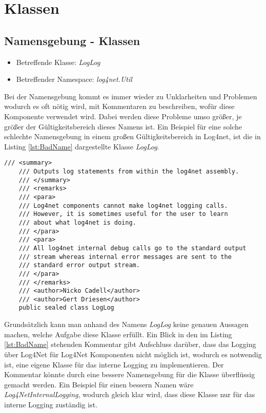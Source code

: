 \section{Klassen}


\subsection{Namensgebung - Klassen}
\begin{itemize}
	\item Betreffende Klasse: \textit{LogLog}
	\item Betreffender Namespace: \textit{log4net.Util}
\end{itemize}

Bei der Namensgebung kommt es immer wieder zu Unklarheiten und Problemen wodurch es oft nötig wird, mit Kommentaren zu beschreiben, wofür diese Komponente verwendet wird. Dabei werden diese Probleme umso größer, je größer der Gültigkeitsbereich dieses Namens ist. Ein Beispiel für eine solche schlechte Namensgebung in einem großen Gültigkeitsbereich in Log4net, ist die in Listing \ref{lst:BadName} dargestellte Klasse \textit{LogLog}. 

\begin{lstlisting}[language={[Sharp]C}, caption=Beispiele für schlechte Namensgebung, label=lst:BadName]
/// <summary>
	/// Outputs log statements from within the log4net assembly.
	/// </summary>
	/// <remarks>
	/// <para>
	/// Log4net components cannot make log4net logging calls.
	/// However, it is sometimes useful for the user to learn 
	/// about what log4net is doing.
	/// </para>
	/// <para>
	/// All log4net internal debug calls go to the standard output 
	/// stream whereas internal error messages are sent to the 
	/// standard error output stream.
	/// </para>
	/// </remarks>
	/// <author>Nicko Cadell</author>
	/// <author>Gert Driesen</author>
	public sealed class LogLog
\end{lstlisting}

Grundsätzlich kann man anhand des Namens \textit{LogLog} keine genauen Aussagen machen, welche Aufgabe diese Klasse erfüllt. Ein Blick in den im Listing \ref{lst:BadName} stehenden Kommentar gibt Aufschluss darüber, dass das Logging über Log4Net für Log4Net Komponenten nicht möglich ist, wodurch es notwendig ist, eine eigene Klasse für das interne Logging zu implementieren. Der Kommentar könnte durch eine bessere Namensgebung für die Klasse überflüssig gemacht werden. Ein Beispiel für einen bessern Namen wäre \textit{Log4NetInternalLogging}, wodurch gleich klar wird, dass diese Klasse nur für das interne Logging zuständig ist. 